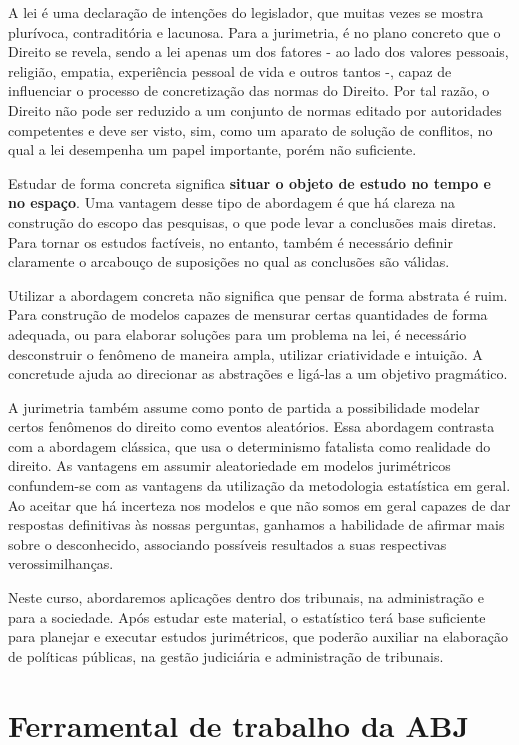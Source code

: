 \documentclass[]{book}
\begin{document}
A lei é uma declaração de intenções do legislador, que muitas vezes se
mostra plurívoca, contraditória e lacunosa. Para a jurimetria, é no
plano concreto que o Direito se revela, sendo a lei apenas um dos
fatores - ao lado dos valores pessoais, religião, empatia, experiência
pessoal de vida e outros tantos -, capaz de influenciar o processo de
concretização das normas do Direito. Por tal razão, o Direito não pode
ser reduzido a um conjunto de normas editado por autoridades competentes
e deve ser visto, sim, como um aparato de solução de conflitos, no qual
a lei desempenha um papel importante, porém não suficiente.

Estudar de forma concreta significa \textbf{situar o objeto de estudo no
tempo e no espaço}. Uma vantagem desse tipo de abordagem é que há
clareza na construção do escopo das pesquisas, o que pode levar a
conclusões mais diretas. Para tornar os estudos factíveis, no entanto,
também é necessário definir claramente o arcabouço de suposições no qual
as conclusões são válidas.

Utilizar a abordagem concreta não significa que pensar de forma abstrata
é ruim. Para construção de modelos capazes de mensurar certas
quantidades de forma adequada, ou para elaborar soluções para um
problema na lei, é necessário desconstruir o fenômeno de maneira ampla,
utilizar criatividade e intuição. A concretude ajuda ao direcionar as
abstrações e ligá-las a um objetivo pragmático.

A jurimetria também assume como ponto de partida a possibilidade modelar
certos fenômenos do direito como eventos aleatórios. Essa abordagem
contrasta com a abordagem clássica, que usa o determinismo fatalista
como realidade do direito. As vantagens em assumir aleatoriedade em
modelos jurimétricos confundem-se com as vantagens da utilização da
metodologia estatística em geral. Ao aceitar que há incerteza nos
modelos e que não somos em geral capazes de dar respostas definitivas às
nossas perguntas, ganhamos a habilidade de afirmar mais sobre o
desconhecido, associando possíveis resultados a suas respectivas
verossimilhanças.

Neste curso, abordaremos aplicações dentro dos tribunais, na
administração e para a sociedade. Após estudar este material, o
estatístico terá base suficiente para planejar e executar estudos
jurimétricos, que poderão auxiliar na elaboração de políticas públicas,
na gestão judiciária e administração de tribunais.

\chapter{Ferramental de trabalho da
ABJ}\label{ferramental-de-trabalho-da-abj}
\end{document}
